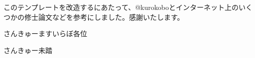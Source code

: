 \begin{acknowledgment}

このテンプレートを改造するにあたって、@kurokoboとインターネット上のいくつかの修士論文などを参考にしました。感謝いたします。

さんきゅーますいらぼ各位

さんきゅー未踏

\end{acknowledgment}
